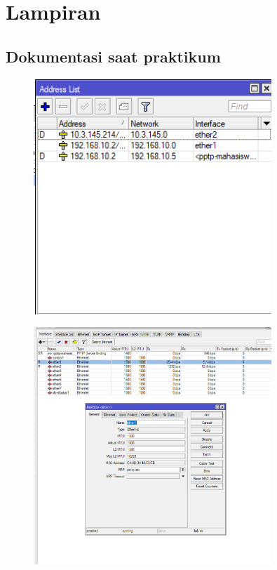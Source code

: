\section{Lampiran}
\subsection{Dokumentasi saat praktikum}
\begin{figure}[H]
\centering
\includegraphics[width=0.8\textwidth]{P1/img/Screenshot 2025-06-05 190731.png}
\end{figure}

\begin{figure}[H]
\centering
\includegraphics[width=0.8\textwidth]{P1/img/Screenshot 2025-06-05 190802.png}
\end{figure}

